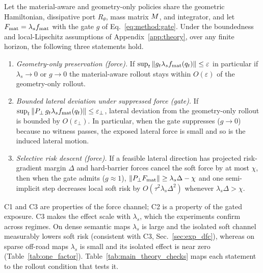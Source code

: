\begin{proposition}
\label{prop:enrichment}
Let the material-aware and geometry-only policies share the geometric Hamiltonian, dissipative port $R_\theta$, mass matrix $M$, and integrator, and let $F_{\rm mat}=\lambda_s f_{\rm mat}$ with the gate $g$ of Eq.~\eqref{eq:method:gate}. Under the boundedness and local-Lipschitz assumptions of Appendix~\ref{app:theory}, over any finite horizon, the following three statements hold.
\begin{enumerate}
  \item[\textbf{C1.}] \emph{Geometry-only preservation (force).} If $\sup_t\|g_t\lambda_s f_{\rm mat}(q_t)\|\le\varepsilon$ in particular if $\lambda_s\!\to\!0$ or $g\!\to\!0$ the material-aware rollout stays within $O(\varepsilon)$ of the geometry-only rollout.
  \item[\textbf{C2.}] \emph{Bounded lateral deviation under suppressed force (gate).} If $\sup_t\|P_\perp\,g_t\lambda_s f_{\rm mat}(q_t)\|\le \varepsilon_\perp$, lateral deviation from the geometry-only rollout is bounded by $O(\varepsilon_\perp)$. In particular, when the gate suppresses ($g\!\to\!0$) because no witness passes, the exposed lateral force is small and so is the induced lateral motion.
  \item[\textbf{C3.}] \emph{Selective risk descent (force).} If a feasible lateral direction has projected risk-gradient margin $\Delta$ and hard-barrier forces cancel the soft force by at most $\chi$, then when the gate admits ($g\!\approx\!1$), $\|P_\perp F_{\rm mat}\|\ge\lambda_s\Delta-\chi$ and one semi-implicit step decreases local soft risk by $O(\tau^2\lambda_s\Delta^2)$ whenever $\lambda_s\Delta>\chi$.
\end{enumerate}
\end{proposition}

C1 and C3 are properties of the force channel; C2 is a property of the gated exposure. C3 makes the effect scale with $\lambda_s$, which the experiments confirm across regimes. On dense semantic maps $\lambda_s$ is large and the isolated soft channel measurably lowers soft risk (consistent with C3, Sec.~\ref{sec:exp_dfc}), whereas on sparse off-road maps $\lambda_s$ is small and its isolated effect is near zero (Table~\ref{tab:one_factor}). Table~\ref{tab:main_theory_checks} maps each statement to the rollout condition that tests it.


